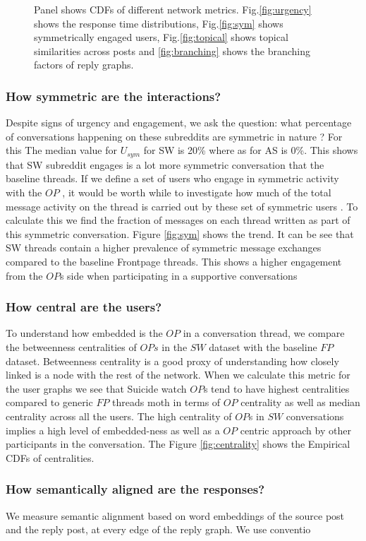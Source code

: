 \begin{figure}[!ht]
    
\caption{Panel shows CDFs of different network metrics. Fig.\ref{fig:urgency} shows the response time distributions, Fig.\ref{fig:sym} shows symmetrically engaged users, Fig.\ref{fig:topical} shows topical similarities across posts and \ref{fig:branching} shows the branching factors of reply graphs. }
\end{figure}

\subsubsection{How symmetric are the interactions?}
Despite signs of urgency and engagement, we ask the question: what percentage of conversations happening on these subreddits are symmetric in nature ? 
For this The median value for $U_{sym}$ for SW is 20\% where as for AS is 0\%. This shows that SW subreddit engages is a lot more symmetric conversation that the baseline threads.
If we define a set of users who engage in symmetric activity with the $OP$ , it would be worth while to investigate how much of the total message activity on the thread is carried out by these set of symmetric users . To calculate this we find the fraction of messages on each thread written as part of this symmetric conversation. Figure \ref{fig:sym} shows the trend. It can be see that SW threads contain a higher prevalence of symmetric message exchanges compared to the baseline Frontpage threads. This shows a higher engagement from the $OP$s side when participating in a supportive conversations

\subsubsection{How central are the users?}
To understand how embedded is the $OP$ in a conversation thread, we compare the betweenness centralities of $OPs$ in the $SW$ dataset with the baseline $FP$ dataset. 
Betweenness centrality is a good proxy of understanding how closely linked is a node with the rest of the network. When we calculate this metric for the user graphs we see that Suicide watch $OP$s tend to have highest centralities compared to generic $FP$ threads moth in terms of $OP$ centrality as well as median centrality across all the users. The high centrality of $OP$s in $SW$ conversations implies a high level of embedded-ness as well as a $OP$ centric approach by other participants in the conversation. The Figure \ref{fig:centrality} shows the Empirical CDFs of centralities. 

\subsubsection{How semantically aligned are the responses?}
We measure semantic alignment based on word embeddings of the source post and the reply post, at every edge of the reply graph. We use conventio



